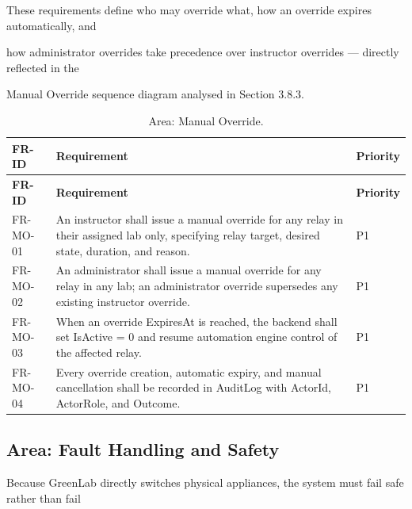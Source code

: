 These requirements define who may override what, how an override expires automatically, and

how administrator overrides take precedence over instructor overrides --- directly reflected in the

Manual Override sequence diagram analysed in Section 3.8.3.

\begin{longtable}{|L{2.0cm}|L{12.0cm}|L{1.5cm}|}
	\caption{Area: Manual Override.} \label{tab:3-13}                                                                                                                                        \\
	\hline
	\textbf{FR-ID} & \textbf{Requirement}                                                                                                                                & \textbf{Priority} \\
	\hline
	\endfirsthead
	\hline
	\textbf{FR-ID} & \textbf{Requirement}                                                                                                                                & \textbf{Priority} \\
	\hline
	\endhead
	\hline
	\endfoot
	\hline
	\endlastfoot
	FR-MO-01       & An instructor shall issue a manual override for any relay in their assigned lab only, specifying relay target, desired state, duration, and reason. & P1                \\
	\hline
	FR-MO-02       & An administrator shall issue a manual override for any relay in any lab; an administrator override supersedes any existing instructor override.     & P1                \\
	\hline
	FR-MO-03       & When an override ExpiresAt is reached, the backend shall set IsActive = 0 and resume automation engine control of the affected relay.               & P1                \\
	\hline
	FR-MO-04       & Every override creation, automatic expiry, and manual cancellation shall be recorded in AuditLog with ActorId, ActorRole, and Outcome.              & P1                \\
	\hline
\end{longtable}


\subsection{Area: Fault Handling and Safety}
Because GreenLab directly switches physical appliances, the system must fail safe rather than fail


